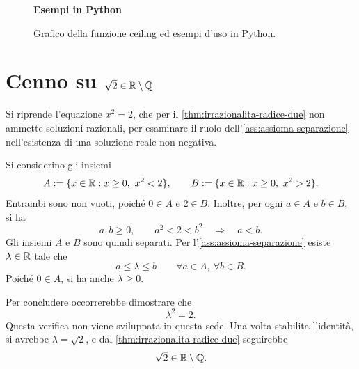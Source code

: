 \clearpage

\begin{figure}[htbp]
  \centering
  \begin{minipage}[c]{0.56\textwidth}
    \centering
    
  \end{minipage}
  \hfill
  \begin{minipage}[c]{0.38\textwidth}
    \small
    \textbf{Esempi in Python}
    
    \vspace{0.5em}
  \end{minipage}
  \caption{Grafico della funzione ceiling ed esempi d'uso in Python.}
  \label{fig:ceiling}
\end{figure}

\section[Cenno sulla radice quadrata di 2 nei reali]
{Cenno su \(\sqrt{2}\in\mathbb{R}\setminus\mathbb{Q}\)}
\label{sec:lez03-completezza-radice-due}

Si riprende l'equazione \(x^2=2\), che per il
\cref{thm:irrazionalita-radice-due} non ammette soluzioni
razionali, per esaminare il ruolo
dell'\cref{ass:assioma-separazione}
nell'esistenza di una soluzione reale non negativa.

Si considerino gli insiemi
\[
  A:=\{x\in\mathbb{R}:x\ge0,\ x^2<2\},
  \qquad
  B:=\{x\in\mathbb{R}:x\ge0,\ x^2>2\}.
\]
Entrambi sono non vuoti, poiché \(0\in A\) e \(2\in B\).
Inoltre, per ogni \(a\in A\) e \(b\in B\), si ha
\[
  a,b\ge0,
  \qquad
  a^2<2<b^2
  \quad\Longrightarrow\quad
  a<b.
\]
Gli insiemi \(A\) e \(B\) sono quindi separati. Per
l'\cref{ass:assioma-separazione}
esiste \(\lambda\in\mathbb{R}\) tale che
\[
  a\le\lambda\le b
  \qquad\forall a\in A,\ \forall b\in B.
\]
Poiché \(0\in A\), si ha anche \(\lambda\ge0\).

Per concludere occorrerebbe dimostrare che
\[
  \lambda^2=2.
\]
Questa verifica non viene sviluppata in questa sede.
Una volta stabilita l'identità, si avrebbe
\(\lambda=\sqrt{2}\), e dal
\cref{thm:irrazionalita-radice-due} seguirebbe
\[
  \sqrt{2}\in\mathbb{R}\setminus\mathbb{Q}.
\]
